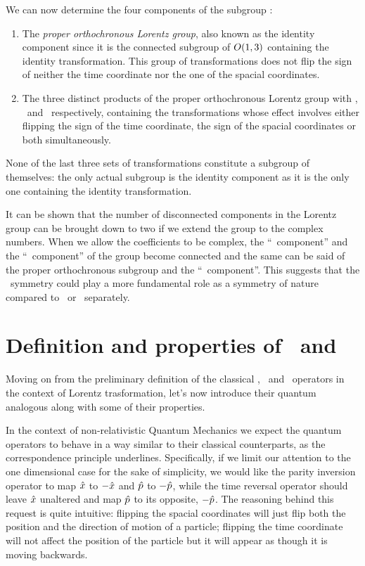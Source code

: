         We can now determine the four components of the subgroup \cite{bender2024}:
        \begin{enumerate}[label = \mybullet]
            \item The \emph{proper orthochronous Lorentz group}, also known as the identity component since it is the connected subgroup of $O\pqty{1,3}$ containing the identity transformation. This group of transformations does not flip the sign of neither the time coordinate nor the one of the spacial coordinates.
            \item The three distinct products of the proper orthochronous Lorentz group with \mcP, \mcT\ and \PT\ respectively, containing the transformations whose effect involves either flipping the sign of the time coordinate, the sign of the spacial coordinates or both simultaneously.
        \end{enumerate}
        None of the last three sets of transformations constitute a subgroup of themselves: the only actual subgroup is the identity component as it is the only one containing the identity transformation.
        
        It can be shown \cite{bender2024} that the number of disconnected components in the Lorentz group can be brought down to two if we extend the group to the complex numbers. When we allow the coefficients to be complex, the ``\mcP\ component'' and the ``\mcT\ component'' of the group become connected and the same can be said of the proper orthochronous subgroup and the ``\PT\ component''. This suggests that the \PT\ symmetry could play a more fundamental role as a symmetry of nature compared to \mcP\ or \mcT\ separately.
    
    \section{Definition and properties of \hP\ and \hT}\label{s:def-of-P-and-T}
        Moving on from the preliminary definition of the classical \mcP, \mcT\ and \PT\ operators in the context of Lorentz trasformation, let's now introduce their quantum analogous along with some of their properties.

        In the context of non-relativistic Quantum Mechanics we expect the quantum operators to behave in a way similar to their classical counterparts, as the correspondence principle underlines. Specifically, if we limit our attention to the one dimensional case for the sake of simplicity, we would like the parity inversion operator to map $\hat{x}$ to $-\hat{x}$ and $\hat{p}$ to $-\hat{p}$, while the time reversal operator should leave $\hat{x}$ unaltered and map $\hat{p}$ to its opposite, $-\hat{p}$. The reasoning behind this request is quite intuitive: flipping the spacial coordinates will just flip both the position and the direction of motion of a particle; flipping the time coordinate will not affect the position of the particle but it will appear as though it is moving backwards.


